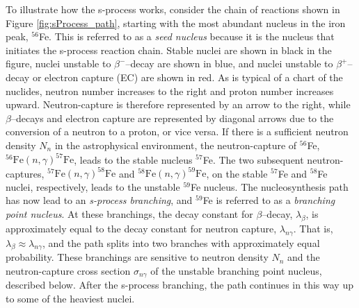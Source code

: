To illustrate how the s-process works, consider the chain of reactions shown in Figure \ref{fig:sProcess_path}, starting with the most abundant nucleus in the iron peak, $^{56}$Fe. This is referred to as a \emph{seed nucleus} because it is the nucleus that initiates the s-process reaction chain. Stable nuclei are shown in black in the figure, nuclei unstable to $\beta^{-}$--decay are shown in blue, and nuclei unstable to $\beta^{+}$--decay or electron capture (EC) are shown in red. As is typical of a chart of the nuclides, neutron number increases to the right and proton number increases upward. Neutron-capture is therefore represented by an arrow to the right, while $\beta$--decays and electron capture are represented by diagonal arrows due to the conversion of a neutron to a proton, or vice versa. If there is a sufficient neutron density $N_{n}$ in the astrophysical environment, the neutron-capture of $^{56}$Fe, $^{56}\mathrm{Fe}(n,\gamma)^{57}\mathrm{Fe}$, leads to the stable nucleus $^{57}$Fe. The two subsequent neutron-captures,  $^{57}\mathrm{Fe}(n,\gamma)^{58}\mathrm{Fe}$ and  $^{58}\mathrm{Fe}(n,\gamma)^{59}\mathrm{Fe}$, on the stable $^{57}$Fe and $^{58}$Fe nuclei, respectively, leads to the unstable $^{59}$Fe nucleus. The nucleosynthesis path has now lead to an \emph{s-process branching}, and $^{59}$Fe is referred to as a \emph{branching point nucleus}. At these branchings, the decay constant for $\beta$--decay, $\lambda_{\beta}$, is approximately equal to the decay constant for neutron capture, $\lambda_{n\gamma}$. That is, $\lambda_{\beta} \approx \lambda_{n\gamma}$, and the path splits into two branches with approximately equal probability. These branchings are sensitive to neutron density $N_{n}$ and the neutron-capture cross section $\sigma_{n\gamma}$ of the unstable branching point nucleus, described below. After the s-process branching, the path continues in this way up to some of the heaviest nuclei.



